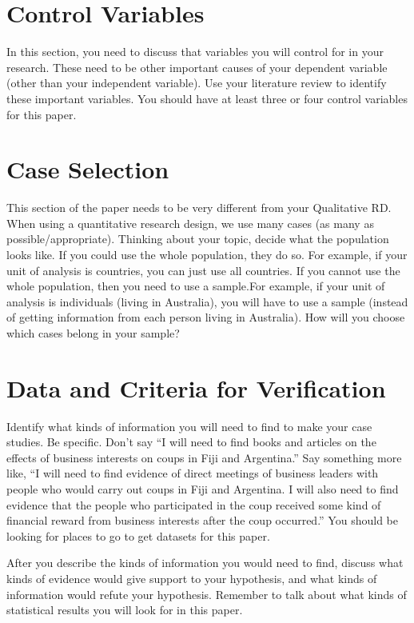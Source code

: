 \documentclass{article}
\begin{document}
\section{Control Variables}
In this section, you need to discuss that variables you will control for in your research. These need to be other important causes of your dependent variable (other than your independent variable). Use your literature review to identify these important variables. You should have at least three or four control variables for this paper.

\section{Case Selection}
This section of the paper needs to be very different from your Qualitative RD. When using a quantitative research design, we use many cases (as many as possible/appropriate). Thinking about your topic, decide what the population looks like. If you could use the whole population, they do so. For example, if your unit of analysis is countries, you can just use all countries. If you cannot use the whole population, then you need to use a sample.For example, if your unit of analysis is individuals (living in Australia), you will have to use a sample (instead of getting information from each person living in Australia). How will you choose which cases belong in your sample?

\section{Data and Criteria for Verification}
Identify what kinds of information you will need to find to make your case studies. Be specific. Don't say ``I will need to find books and articles on the effects of business interests on coups in Fiji and Argentina.'' Say something more like, ``I will need to find evidence of direct meetings of business leaders with people who would carry out coups in Fiji and Argentina. I will also need to find evidence that the people who participated in the coup received some kind of financial reward from business interests after the coup occurred.'' You should be looking for places to go to get datasets for this paper.

After you describe the kinds of information you would need to find, discuss what kinds of evidence would give support to your hypothesis, and what kinds of information would refute your hypothesis. Remember to talk about what kinds of statistical results you will look for in this paper.
\end{document}
